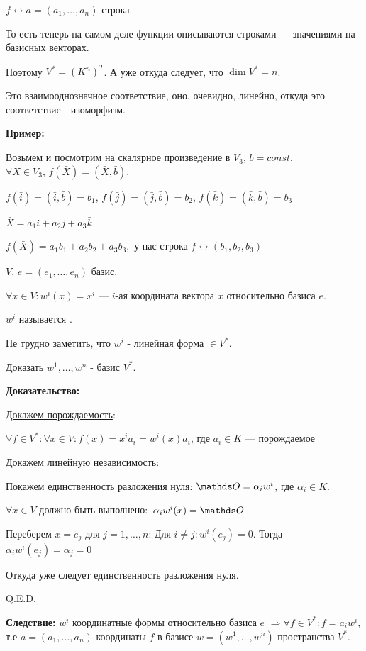$f \leftrightarrow a= (a_1,\ldots, a_n)$ строка. 

То есть теперь на самом деле функции описываются строками --- значениями на базисных векторах.

Поэтому $V^* = (K^n)^T$. А уже откуда следует, что $\dim V^*  = n$. 

Это взаимооднозначное соответствие, оно, очевидно, линейно, откуда это соответствие -  изоморфизм.




\textbf{Пример:} 

 Возьмем и посмотрим на скалярное произведение в
$V_3, \, \bar{b}= const$. $\forall X \in V_3, \, f(\bar{X})=(\bar{X}, \bar{b})$.

$f(\bar{i})=(\bar{i}, \bar{b}) = b_1$, $f(\bar{j})=(\bar{j}, \bar{b}) = b_2$, $f(\bar{k})=(\bar{k}, \bar{b}) = b_3$

$\bar{X}=a_1\bar{i}+a_2\bar{j}+a_3\bar{k}$

$f(\bar{X})=a_1b_1+a_2b_2+a_3b_3, $ у нас строка $f \leftrightarrow (b_1,b_2,b_3)$

 $V$, $e = (e_1,\ldots, e_n)$ базис.

$\forall x \in V: w^i(x) = x^i$ --- $i$-ая координата вектора $x$ относительно базиса $e$.  

$w^i$ называется .

Не трудно заметить, что $w^i$ - линейная форма $\in V^{*}$.


Доказать $w^1,\ldots,w^n$ - базис $V^*$.

\textbf{Доказательство:}

\uline{Докажем порождаемость}: 

$\forall f \in V^*: \forall x \in V: f(x) = x^i a_i = w^i(x)a_i$, где $a_i \in K$ --- порождаемое

\uline{Докажем линейную независимость}:

Покажем единственность разложения нуля: $\zero = \alpha_i w^i $, где $\alpha_i \in K$. 

$\forall x \in V$ должно быть выполнено: $ \, \alpha_iw^i(x)=\zero$

Переберем $x = e_j$ для $j = 1,\ldots, n$: Для $i\neq j: w^i(e_j) = 0$. Тогда $\alpha_iw^i(e_j)=\alpha_j =0$

Откуда уже следует единственность разложения нуля.

\hfill Q.E.D.

\textbf{Следствие:} $w^i$ координатные формы относительно базиса $e$
$\Rightarrow \forall f \in V^*: f = a_iw^i$, т.е $a=(a_1,\ldots,a_n)$  координаты $f$ в базисе $w = (w^1,\ldots, w^n)$ пространства $V^*$.

